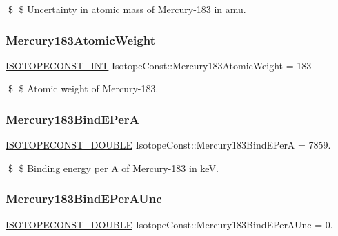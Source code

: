 \$ \$ Uncertainty in atomic mass of Mercury-\/183 in amu. \mbox{\label{group___isotope_const-_mercury-_hg183_gaec4ba48774321b730a0bc3c1576fffdd}} 
\subsubsection{\texorpdfstring{Mercury183\+Atomic\+Weight}{Mercury183AtomicWeight}}
{\footnotesize\ttfamily \mbox{\hyperlink{group___isotope_const-_macros_ga5f18360b3e99483a35c32d789e62621c}{I\+S\+O\+T\+O\+P\+E\+C\+O\+N\+S\+T\+\_\+\+I\+NT}} Isotope\+Const\+::\+Mercury183\+Atomic\+Weight = 183}

\$ \$ Atomic weight of Mercury-\/183. \mbox{\label{group___isotope_const-_mercury-_hg183_ga70b240760b049fd2d289d0ffa7014c78}} 
\subsubsection{\texorpdfstring{Mercury183\+Bind\+E\+PerA}{Mercury183BindEPerA}}
{\footnotesize\ttfamily \mbox{\hyperlink{group___isotope_const-_macros_ga8f45a7272ce02c0b4c65c44636ed719a}{I\+S\+O\+T\+O\+P\+E\+C\+O\+N\+S\+T\+\_\+\+D\+O\+U\+B\+LE}} Isotope\+Const\+::\+Mercury183\+Bind\+E\+PerA = 7859.}

\$ \$ Binding energy per A of Mercury-\/183 in keV. \mbox{\label{group___isotope_const-_mercury-_hg183_ga228ae6884c3b62e273f4be16afa9f405}} 
\subsubsection{\texorpdfstring{Mercury183\+Bind\+E\+Per\+A\+Unc}{Mercury183BindEPerAUnc}}
{\footnotesize\ttfamily \mbox{\hyperlink{group___isotope_const-_macros_ga8f45a7272ce02c0b4c65c44636ed719a}{I\+S\+O\+T\+O\+P\+E\+C\+O\+N\+S\+T\+\_\+\+D\+O\+U\+B\+LE}} Isotope\+Const\+::\+Mercury183\+Bind\+E\+Per\+A\+Unc = 0.}

